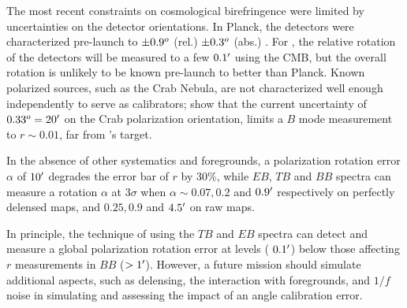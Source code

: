\documentclass[PICOReport.tex]{subfiles}
\begin{document}

The most recent constraints on cosmological birefringence \citet{Planck2016_XLIX} were limited by uncertainties on the detector orientations.  In Planck, the detectors were characterized pre-launch to $\pm 0.9^o$ (rel.) $\pm 0.3^o$ (abs.) \citep{Rosset+2010}. For \pico, the relative rotation of the detectors will be measured to a few $0.1'$ using the CMB, but the overall rotation is unlikely to be known pre-launch to better than Planck.  Known polarized sources, such as the Crab Nebula, are not characterized well enough independently to serve as calibrators; \citet{Aumont+2018} show that the current uncertainty of $0.33^o = 20'$ on the Crab polarization orientation, limits a $B$ mode measurement to $r \sim 0.01$, far from \pico's target.


In the absence of other systematics and foregrounds, a polarization rotation error $\alpha$ of $10'$ degrades 
the error bar of $r$ by 30\%, while $EB$, $TB$ and $BB$ spectra can measure a rotation $\alpha$ at 3$\sigma$ when $\alpha \sim 0.07, 0.2$  and $0.9'$ respectively
 on perfectly delensed maps, and $0.25, 0.9$ and $4.5'$ on raw maps.

In principle, the technique of using the $TB$ and $EB$ spectra can detect and measure a global polarization rotation error at levels ($~0.1 '$) below those affecting $r$ measurements in $BB$ ($> 1 '$).  However, a future mission should simulate additional aspects, such as delensing, the interaction with foregrounds, and $1/f$ noise in simulating and assessing the impact of an angle calibration error.
\end{document}
